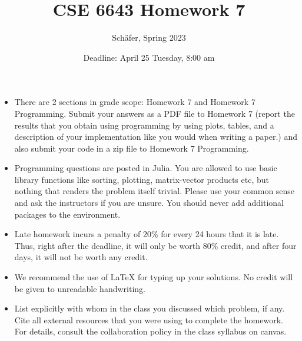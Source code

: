 \documentclass[twoside,10pt]{article}
\begin{document}
\title{CSE 6643 Homework 7}
\author{Sch{\"a}fer, Spring 2023}
\date{Deadline: April 25 Tuesday, 8:00 am}
\maketitle

\begin{itemize}
  \item There are 2 sections in grade scope: Homework 7 and Homework 7 Programming. Submit your answers as a PDF file to Homework 7 (report the results that you obtain using programming by using plots, tables, and a description of your implementation like you would when writing a paper.) and also submit your code in a zip file to Homework 7 Programming. 
  \item Programming questions are posted in Julia. You are allowed to use basic library functions like sorting, plotting, matrix-vector products etc, but nothing that renders the problem itself trivial. Please use your common sense and ask the instructors if you are unsure. 
  You should never add additional packages to the environment.
  \item Late homework incurs a penalty of 20\% for every 24 hours that it is late. Thus, right after the deadline, it will only be worth 80\% credit, and after four days, it will not be worth any credit. 
  \item We recommend the use of LaTeX for typing up your solutions. No credit will be given to unreadable handwriting.
  \item List explicitly with whom in the class you discussed which problem, if any. Cite all external resources that you were using to complete the homework. For details, consult the collaboration policy in the class syllabus on canvas.
\end{itemize}
\end{document}
